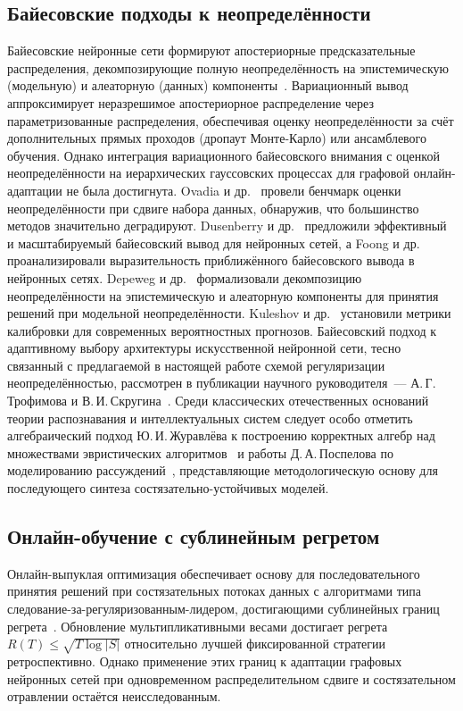 \subsection{Байесовские подходы к неопределённости}

Байесовские нейронные сети формируют апостериорные предсказательные распределения, декомпозирующие полную неопределённость на эпистемическую (модельную) и алеаторную (данных) компоненты~\cite{Gal2016,Blundell2015,Lakshminarayanan2017,Kendall2017}. Вариационный вывод аппроксимирует неразрешимое апостериорное распределение через параметризованные распределения, обеспечивая оценку неопределённости за счёт дополнительных прямых проходов (дропаут Монте-Карло) или ансамблевого обучения. Однако интеграция вариационного байесовского внимания с оценкой неопределённости на иерархических гауссовских процессах для графовой онлайн-адаптации не была достигнута. Ovadia и др.~\cite{Ovadia2019} провели бенчмарк оценки неопределённости при сдвиге набора данных, обнаружив, что большинство методов значительно деградируют. Dusenberry и др.~\cite{Dusenberry2020} предложили эффективный и масштабируемый байесовский вывод для нейронных сетей, а Foong и др.~\cite{Foong2019} проанализировали выразительность приближённого байесовского вывода в нейронных сетях. Depeweg и др.~\cite{Depeweg2018} формализовали декомпозицию неопределённости на эпистемическую и алеаторную компоненты для принятия решений при модельной неопределённости. Kuleshov и др.~\cite{Kuleshov2018} установили метрики калибровки для современных вероятностных прогнозов. Байесовский подход к адаптивному выбору архитектуры искусственной нейронной сети, тесно связанный с предлагаемой в настоящей работе схемой регуляризации неопределённостью, рассмотрен в публикации научного руководителя~--- А.\,Г.\,Трофимова и В.\,И.\,Скругина~\cite{Trofimov2019bayes}. Среди классических отечественных оснований теории распознавания и интеллектуальных систем следует особо отметить алгебраический подход Ю.\,И.\,Журавлёва к построению корректных алгебр над множествами эвристических алгоритмов~\cite{Zhuravlev1977} и работы Д.\,А.\,Поспелова по моделированию рассуждений~\cite{Pospelov1989}, представляющие методологическую основу для последующего синтеза состязательно-устойчивых моделей.


\subsection{Онлайн-обучение с сублинейным регретом}

Онлайн-выпуклая оптимизация обеспечивает основу для последовательного принятия решений при состязательных потоках данных с алгоритмами типа следование-за-регуляризованным-лидером, достигающими сублинейных границ регрета~\cite{Shalev2012,Arjovsky2017}. Обновление мультипликативными весами достигает регрета $R(T)\leq\sqrt{T\log|S|}$ относительно лучшей фиксированной стратегии ретроспективно. Однако применение этих границ к адаптации графовых нейронных сетей при одновременном распределительном сдвиге и состязательном отравлении остаётся неисследованным.

